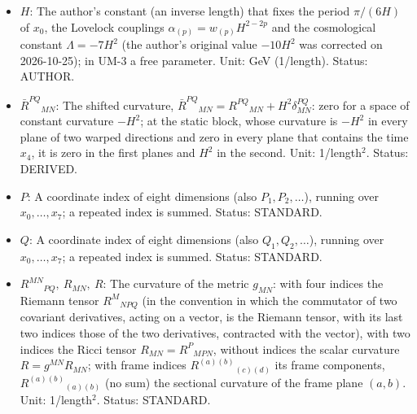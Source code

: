 \documentclass[
  10pt,
]{article}
\begin{document}
\begin{itemize}
  square matrix of the Kronecker deltas \(\delta^{M_a}_{N_b}\) (\(+1\)
  or \(-1\) if the upper indices are an even or odd permutation of the
  lower ones, 0 otherwise). Status: STANDARD.
\item
  \(H\): The author's constant (an inverse length) that fixes the period
  \(\pi/(6H)\) of \(x_0\), the Lovelock couplings
  \(\alpha_{(p)} = w_{(p)}H^{2-2p}\) and the cosmological constant
  \(\Lambda = -7H^2\) (the author's original value \(-10H^2\) was
  corrected on 2026-10-25); in UM-3 a free parameter. Unit: GeV
  (1/length). Status: AUTHOR.
\item
  \(\bar R^{PQ}{}_{MN}\): The shifted curvature,
  \(\bar R^{PQ}{}_{MN} = R^{PQ}{}_{MN} + H^2\delta^{PQ}_{MN}\): zero for
  a space of constant curvature \(-H^2\); at the static block, whose
  curvature is \(-H^2\) in every plane of two warped directions and zero
  in every plane that contains the time \(x_4\), it is zero in the first
  planes and \(H^2\) in the second. Unit: 1/length\(^2\). Status:
  DERIVED.
\item
  \(P\): A coordinate index of eight dimensions (also
  \(P_1, P_2, \dots\)), running over \(x_0, \dots, x_7\); a repeated
  index is summed. Status: STANDARD.
\item
  \(Q\): A coordinate index of eight dimensions (also
  \(Q_1, Q_2, \dots\)), running over \(x_0, \dots, x_7\); a repeated
  index is summed. Status: STANDARD.
\item
  \(R^{MN}{}_{PQ},\ R_{MN},\ R\): The curvature of the metric
  \(g_{MN}\): with four indices the Riemann tensor \(R^M{}_{NPQ}\) (in
  the convention in which the commutator of two covariant derivatives,
  acting on a vector, is the Riemann tensor, with its last two indices
  those of the two derivatives, contracted with the vector), with two
  indices the Ricci tensor \(R_{MN} = R^P{}_{MPN}\), without indices the
  scalar curvature \(R = g^{MN}R_{MN}\); with frame indices
  \(R^{(a)(b)}{}_{(c)(d)}\) its frame components,
  \(R^{(a)(b)}{}_{(a)(b)}\) (no sum) the sectional curvature of the
  frame plane \((a, b)\). Unit: 1/length\(^2\). Status: STANDARD.
\end{itemize}
\end{document}
